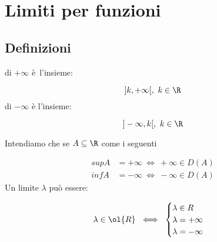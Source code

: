 \documentclass[../analisi.tex]{subfiles}
\begin{document}
\section{Limiti per funzioni}
\subsection{Definizioni}

\begin{defn} 
 di $ + \infty$ è l'insieme:


\begin{equation}
	]k, + \infty [,\ k \in \R
\end{equation}
 di $ - \infty$ è l'insieme:


\begin{equation}
	] - \infty, k [, \ k \in \R
\end{equation}
\end{defn}
Intendiamo che se $ \acr $ come i seguenti


\begin{equation}
	\begin{aligned}
	sup A &= + \infty\ \iff\ + \infty \in D(A)\\
	inf A &= - \infty\ \iff\ - \infty \in D(A)
	\end{aligned}	
\end{equation}
Un limite $\lambda$ può essere:


\begin{equation}
	\lambda \in \ol{R}\ \iff\ 
	\begin{cases}
		\lambda \in R\\
		\lambda = +\infty\\
		\lambda = -\infty
	\end{cases}
\end{equation}
\end{document}
